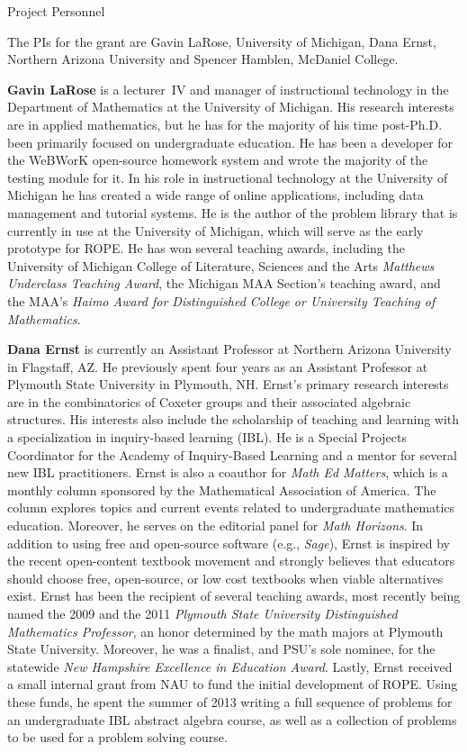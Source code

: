 \documentclass[11pt]{article}
\begin{document}
\begin{section}{Project Personnel}

The PIs for 
the grant are Gavin LaRose, University of Michigan, Dana
Ernst, Northern Arizona University and Spencer Hamblen, McDaniel College.

\textbf{Gavin LaRose} is a lecturer~IV and manager of instructional
technology in the Department of Mathematics at the University of Michigan.
His research interests are in applied mathematics, but he has for the
majority of his time post-Ph.D. been primarily focused on undergraduate
education.  He has been a developer for the WeBWorK open-source homework
system and wrote the majority of the testing module for it.  In his role
in instructional technology at the University of Michigan he has created a
wide range of online applications, including data management and tutorial
systems.  He is the author of the problem library that is currently in use
at the University of Michigan, which will serve as the early prototype for
ROPE.  He has won several teaching awards, including the University of
Michigan College of Literature, Sciences and the Arts \emph{Matthews
  Underclass Teaching Award}, the Michigan MAA Section's teaching award,
and the MAA's \emph{Haimo Award for Distinguished College or University
  Teaching of Mathematics}.

\textbf{Dana Ernst} is currently an Assistant Professor at Northern
Arizona University in Flagstaff, AZ. He previously spent four years as an
Assistant Professor at Plymouth State University in Plymouth, NH. Ernst's
primary research interests are in the combinatorics of Coxeter groups and
their associated algebraic structures.  His interests also include the
scholarship of teaching and learning with a specialization in
inquiry-based learning (IBL). He is a Special Projects Coordinator for the
Academy of Inquiry-Based Learning and a mentor for several new IBL
practitioners. Ernst is also a coauthor for \emph{Math Ed Matters}, which
is a monthly column sponsored by the Mathematical Association of
America. The column explores topics and current events related to
undergraduate mathematics education. Moreover, he serves on the editorial
panel for \emph{Math Horizons}.  In addition to using free and open-source 
software (e.g., \emph{Sage}), Ernst is inspired by the recent
open-content textbook movement and strongly believes that educators should
choose free, open-source, or low cost textbooks when viable alternatives
exist.  Ernst has been the recipient of several teaching awards, most
recently being named the 2009 and the 2011 \emph{Plymouth State University
Distinguished Mathematics Professor}, an honor determined by the math
majors at Plymouth State University.  Moreover, he was a
finalist, and PSU's sole nominee, for the statewide \emph{New Hampshire
Excellence in Education Award}.  Lastly, Ernst received a small internal grant from NAU to fund the initial development of ROPE.  Using these funds, he spent the summer of 2013 writing a full sequence of problems for an undergraduate IBL abstract algebra course, as well as a collection of problems to be used for a problem solving course.


\end{section}
\end{document}
